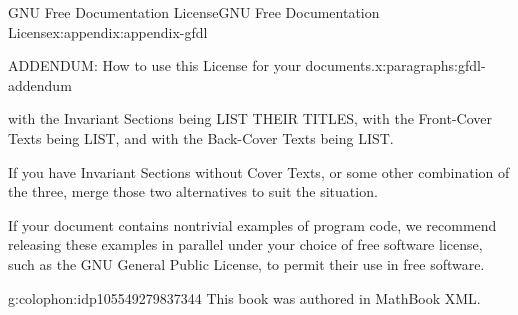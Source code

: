 \documentclass[twoside,10pt,]{book}
\newcommand{\xreffont}{\relax}
\numberwithin{equation}{part}
\providecommand\phantomsection{}
\begin{document}
\begin{appendixptx}{GNU Free Documentation License}{}{GNU Free Documentation License}{}{}{x:appendix:appendix-gfdl}
\begin{paragraphs}{ADDENDUM: How to use this License for your documents.}{x:paragraphs:gfdl-addendum}
\begin{preformatted}
with the Invariant Sections being LIST THEIR TITLES, with the
Front-Cover Texts being LIST, and with the Back-Cover Texts being LIST.
\end{preformatted}
If you have Invariant Sections without Cover Texts, or some other combination of the three, merge those two alternatives to suit the situation.%
\par
If your document contains nontrivial examples of program code, we recommend releasing these examples in parallel under your choice of free software license, such as the GNU General Public License, to permit their use in free software.%
\end{paragraphs}%
\end{appendixptx}
%
\backmatter%
%
\clearpage\phantomsection%
%
%
{\xreffont\printindex}
%
\cleardoublepage
\pagestyle{empty}
\begin{backcolophon}{g:colophon:idp105549279837344}%
This book was authored in MathBook XML.%
\end{backcolophon}%
\end{document}
